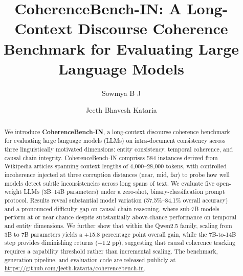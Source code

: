 \documentclass{llncs}
\begin{document}
\title{CoherenceBench-IN: A Long-Context Discourse Coherence Benchmark
for Evaluating Large Language Models}


\author{
  Sowmya B J \and
  Jeeth Bhavesh Kataria
}



\maketitle

\begin{abstract}
We introduce \textbf{CoherenceBench-IN}, a long-context discourse coherence
benchmark for evaluating large language models (LLMs) on intra-document consistency
across three linguistically motivated dimensions: entity consistency, temporal coherence,
and causal chain integrity.
CoherenceBench-IN comprises 584 instances derived from Wikipedia articles
spanning context lengths of 4{,}000--28{,}000 tokens,
with controlled incoherence injected at three corruption distances (near, mid, far)
to probe how well models detect subtle inconsistencies across long spans of text.
We evaluate five open-weight LLMs (3B--14B parameters) under a zero-shot,
binary-classification prompt protocol.
Results reveal substantial model variation (57.5\%--84.1\% overall accuracy)
and a pronounced difficulty gap on causal chain reasoning,
where sub-7B models perform at or near chance despite substantially above-chance performance on temporal and entity dimensions.
We further show that within the Qwen2.5 family, scaling from 3B to 7B parameters
yields a +15.8 percentage point overall gain,
while the 7B-to-14B step provides diminishing returns (+1.2 pp),
suggesting that causal coherence tracking requires a capability threshold
rather than incremental scaling.
The benchmark, generation pipeline, and evaluation code are released publicly at \url{https://github.com/jeeth-kataria/coherencebench-in}.
\end{abstract}

\end{document}
